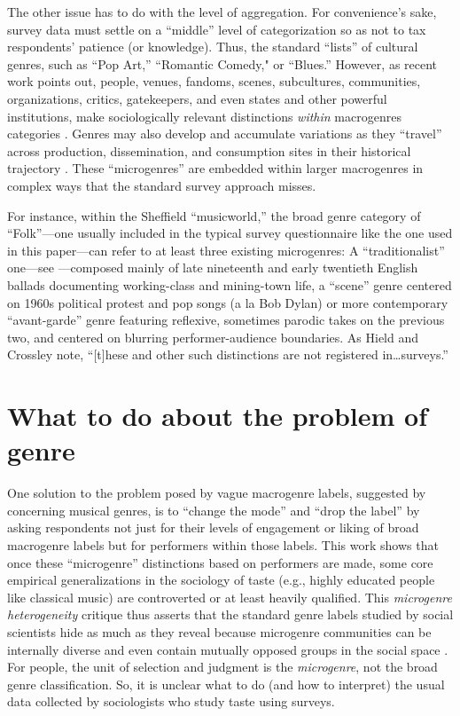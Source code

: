 \documentclass[a4paper,12pt]{extarticle}
\begin{document}
The other issue has to do with the level of aggregation. For convenience’s sake, survey data must settle on a ``middle'' level of categorization so as not to tax respondents' patience (or knowledge). Thus, the standard ``lists'' of cultural genres, such as ``Pop Art,'' ``Romantic Comedy," or ``Blues.'' However, as recent work points out, people, venues, fandoms, scenes, subcultures, communities, organizations, critics, gatekeepers, and even states and other powerful institutions, make sociologically relevant distinctions \textit{within} macrogenres categories \citep{hesmondhalgh2005subcultures, Holt2007, Van_Poecke2018, Hield2014-xe}. Genres may also develop and accumulate variations as they ``travel'' across production, dissemination, and consumption sites in their historical trajectory \citep{Lena2012}. These ``microgenres'' are embedded within larger macrogenres in complex ways that the standard survey approach misses.

For instance, within the Sheffield ``musicworld,'' the broad genre category of ``Folk''---one usually included in the typical survey questionnaire like the one used in this paper---can refer to at least three existing microgenres: A ``traditionalist'' one---see \citep{Lena2012}---composed mainly of late nineteenth and early twentieth English ballads documenting working-class and mining-town life, a ``scene'' genre centered on 1960s political protest and pop songs (a la Bob Dylan) or more contemporary ``avant-garde'' genre featuring reflexive, sometimes parodic takes on the previous two, and centered on blurring performer-audience boundaries. As Hield and Crossley \citeyearpar[197]{Hield2014-xe} note, ``[t]hese and other such distinctions are not registered in\ldots surveys.''

\section{What to do about the problem of genre}
One solution to the problem posed by vague macrogenre labels, suggested by \citet{vlegels2015music, vlegels2017music} concerning musical genres, is to ``change the mode'' and ``drop the label'' by asking respondents not just for their levels of engagement or liking of broad macrogenre labels but for performers within those labels. This work shows that once these ``microgenre'' distinctions based on performers are made, some core empirical generalizations in the sociology of taste (e.g., highly educated people like classical music) are controverted or at least heavily qualified. This \textit{microgenre heterogeneity} critique thus asserts that the standard genre labels studied by social scientists hide as much as they reveal because microgenre communities can be internally diverse and even contain mutually opposed groups in the social space \citep{flemmen_etal18}. For people, the unit of selection and judgment is the {\em microgenre}, not the broad genre classification. So, it is unclear what to do (and how to interpret) the usual data collected by sociologists who study taste using surveys. 
\end{document}
